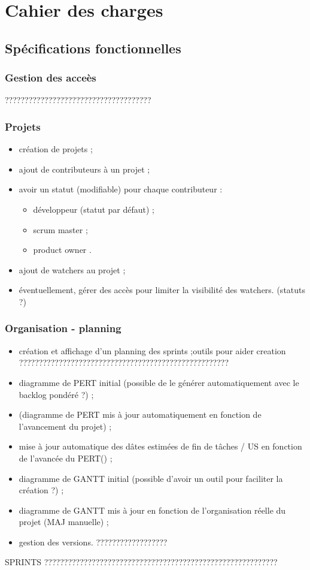 \chapter{Cahier des charges}
\section{Sp\'ecifications fonctionnelles}
\subsection{Gestion des acce\`es}
?????????????????????????????????????
\subsection{Projets}
\begin{itemize}
\item cr\'eation de projets ;
\item ajout de contributeurs \`a un projet ;
\item avoir un statut (modifiable) pour chaque contributeur :
\begin{itemize}
\item d\'eveloppeur (statut par d\'efaut) ;
\item scrum master ;
\item product owner .
\end{itemize}
\item ajout de \og{}watchers\fg{} au projet ;
\item \'eventuellement, g\'erer des acc\`es pour limiter la visibilit\'e des \og{}watchers\fg{}. (statuts ?)
\end{itemize}
\subsection{Organisation - planning}
\begin{itemize}
\item cr\'eation et affichage d'un planning des sprints\label{sprint} ;outils pour aider creation ?????????????????????????????????????????????????????
\item diagramme de PERT initial (possible de le g\'en\'erer automatiquement avec le backlog pond\'er\'e ?) ;
\item (diagramme de PERT mis \`a jour automatiquement en fonction de l'avancement du projet) ;
\item mise \`a jour automatique des d\^ates estim\'ees de fin de t\^aches / US en fonction de l'avanc\'ee du PERT(\label{maj_dates_estimees}) ;
\item diagramme de GANTT initial (possible d'avoir un outil pour faciliter la cr\'eation ?) ;
\item diagramme de GANTT mis \`a jour en fonction de l'organisation r\'eelle du projet (MAJ manuelle) ;
\item gestion des versions. ??????????????????
\end{itemize}
SPRINTS ???????????????????????????????????????????????????????????

